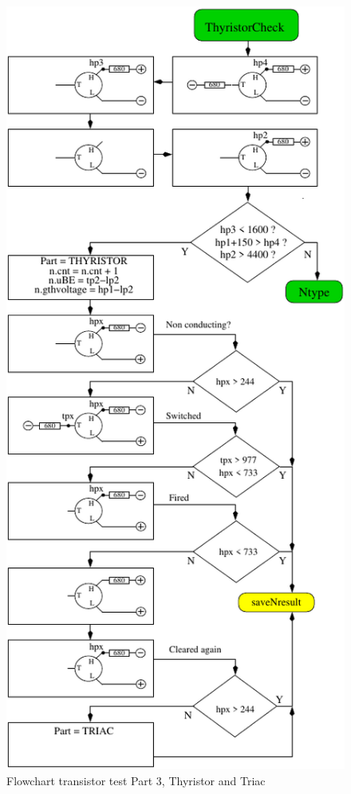 \begin{figure}[H]
\centering
\includegraphics[]{../FIG/CheckSemi3.pdf}
\caption{Flowchart transistor test Part 3, Thyristor and Triac}
\label{fig:ChkSemi3}
\end{figure}



